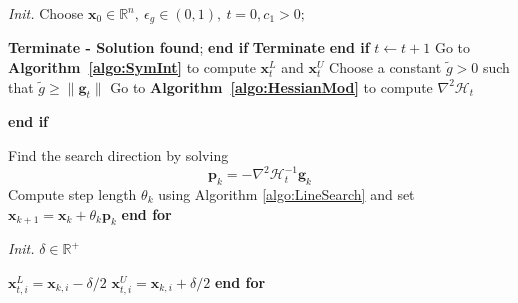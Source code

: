 \documentclass{elsarticle}
\numberwithin{equation}{section}
\begin{document}
\begin{algorithm}[H]
\caption{INTHOP:F}
\textit{Init.} Choose $\mathbf{x}_0 \in \mathbb{R}^n,\ \epsilon_g \in (0, 1),\ t = 0, c_1>0;$\par
\begin{algorithmic}
        \State \textbf{Terminate - Solution found};
        \vspace{0.3em}
    \EndIf \textbf{end if}
        \State \textbf{Terminate}
        \vspace{0.3em}
    \EndIf \textbf{end if}
        \State $t \xleftarrow{} t + 1$
        \State Go to \textbf{Algorithm~\ref{algo:SymInt}} to compute $\mathbf{x}^L_t$ and $\mathbf{x}^U_t$
        \State Choose  a constant $\tilde g >0$ such that $\tilde g \geq \lVert \textbf{g}_{t}\rVert$
        \State Go to \textbf{Algorithm~\ref{algo:HessianMod}} to compute $\nabla^2 \mathcal{H}_t$
         
    \vspace{0.5em}
    \EndIf \textbf{end if}
    
   \State Find the search direction by solving
    \begin{equation}\label{p_k}
        \mathbf{p}_k = - \nabla^2 \mathcal{H}_t^{-1}\mathbf{g}_k
    \end{equation}
   \State Compute step length $\theta_k$ using Algorithm \ref{algo:LineSearch} and set $\mathbf{x}_{k+1} = \mathbf{x}_k + \theta_k \mathbf{p}_k$
\EndFor \textbf{end for}
\end{algorithmic}
\label{algo:GlobalStructure}
\end{algorithm}



\begin{algorithm}[H]
\caption{Symmetric interval generation scheme}
\textit{Init. }$\delta \in \mathbb{R}^+$
\begin{algorithmic}
    \State $\mathbf{x}^L_{t,i} = \mathbf{x}_{k,i} - \delta / 2$
    \vspace{0.2em}
    \State $\mathbf{x}^U_{t,i} = \mathbf{x}_{k,i} + \delta / 2$
    \vspace{0.3em}
\EndFor \textbf{end for}
\end{algorithmic}
\label{algo:SymInt}
\end{algorithm}
\end{document}

